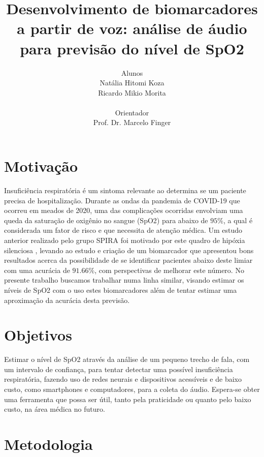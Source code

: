 \documentclass[12pt, a4paper]{article}
\begin{document}
\title{Desenvolvimento de biomarcadores a partir de voz: análise de áudio para previsão do nível de SpO2}

\author{Alunos\\ Natália Hitomi Koza \\ Ricardo Mikio Morita \\ \\Orientador\\ Prof. Dr. Marcelo Finger}
\maketitle

\section{Motivação}

Insuficiência respiratória é um sintoma relevante ao determina se um paciente precisa de hospitalização. Durante as ondas da pandemia de COVID-19 que ocorreu em meados de 2020, uma das complicações ocorridas envolviam uma queda da saturação de oxigênio no sangue (SpO2) para abaixo de $95\%$, a qual é considerada um fator de risco e que necessita de atenção médica\cite{manualcovid}. Um estudo anterior realizado pelo grupo SPIRA foi motivado por este quadro de hipóxia silenciosa \citep{casanova2021deep}, levando ao estudo e criação de um biomarcador que apresentou bons resultados acerca da possibilidade de se identificar pacientes abaixo deste limiar com uma acurácia de $91.66\%$, com perspectivas de melhorar este número. No presente trabalho buscamos trabalhar numa linha similar, visando estimar os níveis de SpO2 com o uso estes biomarcadores além de tentar estimar uma aproximação da acurácia desta previsão.


\section{Objetivos}

Estimar o nível de SpO2 através da análise de um pequeno trecho de fala, com um intervalo de confiança, para tentar detectar uma possível insuficiência respiratória, fazendo uso de redes neurais e dispositivos acessíveis e de baixo custo, como smartphones e computadores, para a coleta do áudio. Espera-se obter uma ferramenta que possa ser útil, tanto pela praticidade ou quanto pelo baixo custo, na área médica no futuro.

\section{Metodologia}
\end{document}
